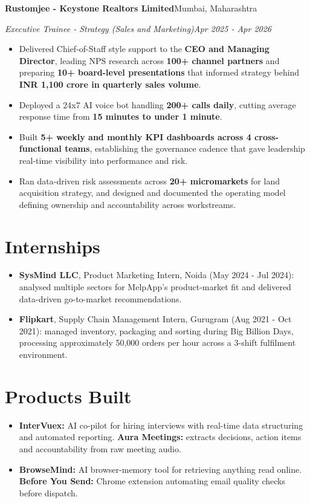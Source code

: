 \documentclass[10pt,a4paper]{article}
\newcommand{\role}[2]{\textbf{#1}\hfill#2\par}
\newcommand{\designation}[2]{\textit{#1}\hfill\textit{#2}\par\vspace{1pt}}
\begin{document}
\vspace{3pt}
\role{Rustomjee - Keystone Realtors Limited}{Mumbai, Maharashtra}
\designation{Executive Trainee - Strategy (Sales and Marketing)}{Apr 2025 - Apr 2026}
\begin{itemize}
  \item Delivered Chief-of-Staff style support to the \textbf{CEO and Managing Director}, leading NPS research across
        \textbf{100+ channel partners} and preparing \textbf{10+ board-level presentations} that informed strategy behind
        \textbf{INR 1,100 crore in quarterly sales volume}.
  \item Deployed a 24x7 AI voice bot handling \textbf{200+ calls daily}, cutting average response time from
        \textbf{15 minutes to under 1 minute}.
  \item Built \textbf{5+ weekly and monthly KPI dashboards across 4 cross-functional teams}, establishing the governance
        cadence that gave leadership real-time visibility into performance and risk.
  \item Ran data-driven risk assessments across \textbf{20+ micromarkets} for land acquisition strategy, and designed and
        documented the operating model defining ownership and accountability across workstreams.
\end{itemize}

\section{Internships}
\begin{itemize}
  \item \textbf{SysMind LLC}, Product Marketing Intern, Noida (May 2024 - Jul 2024): analysed multiple sectors for
        MelpApp's product-market fit and delivered data-driven go-to-market recommendations.
  \item \textbf{Flipkart}, Supply Chain Management Intern, Gurugram (Aug 2021 - Oct 2021): managed inventory, packaging
        and sorting during Big Billion Days, processing approximately 50,000 orders per hour across a 3-shift fulfilment
        environment.
\end{itemize}

\section{Products Built}
\begin{itemize}
  \item \textbf{InterVuex:} AI co-pilot for hiring interviews with real-time data structuring and automated reporting.
        \textbf{Aura Meetings:} extracts decisions, action items and accountability from raw meeting audio.
  \item \textbf{BrowseMind:} AI browser-memory tool for retrieving anything read online.
        \textbf{Before You Send:} Chrome extension automating email quality checks before dispatch.
\end{itemize}
\end{document}
